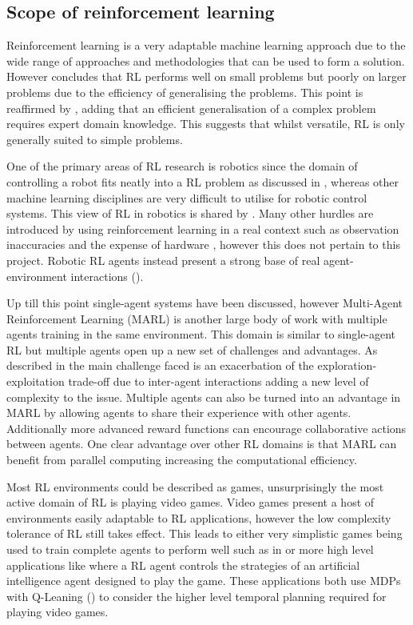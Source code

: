 \documentclass[10pt,journal]{IEEEtran}
\begin{document}
\subsection{Scope of reinforcement learning}
Reinforcement learning is a very adaptable machine learning approach due to the wide range of approaches and methodologies that can be used to form a solution. However \cite{Kaelbling} concludes that RL performs well on small problems but poorly on larger problems due to the efficiency of generalising the problems. This point is reaffirmed by \cite{Wirth}, adding that an efficient generalisation of a complex problem requires expert domain knowledge. This suggests that whilst versatile, RL is only generally suited to simple problems.

One of the primary areas of RL research is robotics since the domain of controlling a robot fits neatly into a RL problem as discussed in \cite{Kober}, whereas other machine learning disciplines are very difficult to utilise for robotic control systems. This view of RL in robotics is shared by \cite{Smart}. Many other hurdles are introduced by using reinforcement learning in a real context such as observation inaccuracies and the expense of hardware \cite{Kober}, however this does not pertain to this project. Robotic RL agents instead present a strong base of real agent-environment interactions (\cite{Kober}).

Up till this point single-agent systems have been discussed, however Multi-Agent Reinforcement Learning (MARL) is another large body of work with multiple agents training in the same environment. This domain is similar to single-agent RL but multiple agents open up a new set of challenges and advantages. As described in \cite{Busoniu} the main challenge faced is an exacerbation of the exploration-exploitation trade-off due to inter-agent interactions adding a new level of complexity to the issue. Multiple agents can also be turned into an advantage in MARL by allowing agents to share their experience with other agents. Additionally more advanced reward functions can encourage collaborative actions between agents. One clear advantage over other RL domains is that MARL can benefit from parallel computing increasing the computational efficiency.

Most RL environments could be described as games, unsurprisingly the most active domain of RL is playing video games. Video games present a host of environments easily adaptable to RL applications, however the low complexity tolerance of RL still takes effect. This leads to either very simplistic games being used to train complete agents to perform well such as in \cite{Bellemare} or more high level applications like \cite{Amato} where a RL agent controls the strategies of an artificial intelligence agent designed to play the game. These applications both use MDPs with Q-Leaning (\cite{Watkins}) to consider the higher level temporal planning required for playing video games.
\end{document}
